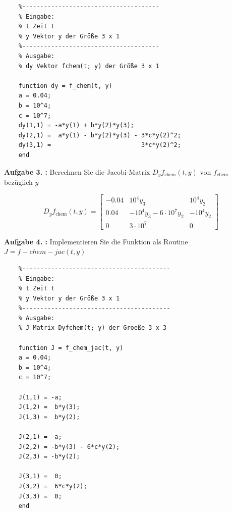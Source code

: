 \begin{lstlisting}[style=Matlab-editor]
	% dy=f_chem(t,y)
	%--------------------------------------
	% Eingabe:
	% t Zeit t
	% y Vektor y der Größe 3 x 1
	%--------------------------------------
	% Ausgabe:
	% dy Vektor fchem(t; y) der Größe 3 x 1

	function dy = f_chem(t, y)
	a = 0.04;
	b = 10^4;
	c = 10^7;
	dy(1,1) = -a*y(1) + b*y(2)*y(3);
	dy(2,1) =  a*y(1) - b*y(2)*y(3) - 3*c*y(2)^2;
	dy(3,1) =                         3*c*y(2)^2;
	end
\end{lstlisting}


\begin{mybox}
	\textbf{Aufgabe 3. :}	Berechnen Sie die Jacobi-Matrix $ D_yf_{\mathrm{chem}}(t,y) $ von $ f_{\mathrm{chem}} $ bezüglich $ y $
\end{mybox} 

\begin{equation}
	D_yf_{\mathrm{chem}}(t,y) =
\begin{bmatrix}
	-0.04 & 10^4y_3 & 10^4y_2 \\
	0.04 & -10^4y_3-6\cdot 10^7y_2 & -10^4y_2 \\
	0 & 3\cdot 10^7 & 0 
\end{bmatrix}
\end{equation}

\begin{mybox}
	\textbf{Aufgabe 4. :}	Implementieren Sie die Funktion als Routine $ J = f-chem-jac(t,y) $
\end{mybox}
 
\begin{lstlisting}[style=Matlab-editor]
	% J=f_chem_jac(t,y)
	%-----------------------------------------
	% Eingabe:
	% t Zeit t
	% y Vektor y der Größe 3 x 1
	%-----------------------------------------
	% Ausgabe:
	% J Matrix Dyfchem(t; y) der Groeße 3 x 3

	function J = f_chem_jac(t, y)
	a = 0.04;
	b = 10^4;
	c = 10^7;

	J(1,1) = -a;
	J(1,2) =  b*y(3); 
	J(1,3) =  b*y(2);

	J(2,1) =  a;
	J(2,2) = -b*y(3) - 6*c*y(2);
	J(2,3) = -b*y(2);

	J(3,1) =  0;
	J(3,2) =  6*c*y(2);
	J(3,3) =  0;
	end
\end{lstlisting}

